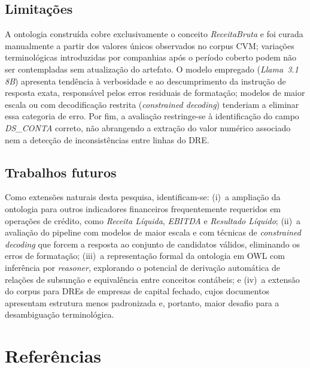 \documentclass[12pt,a4paper]{article}
\begin{document}
\subsection{Limitações}

A ontologia construída cobre exclusivamente o conceito \textit{ReceitaBruta} e foi curada manualmente a partir dos valores únicos observados no corpus CVM; variações terminológicas introduzidas por companhias após o período coberto podem não ser contempladas sem atualização do artefato. O modelo empregado (\textit{Llama~3.1 8B}) apresenta tendência à verbosidade e ao descumprimento da instrução de resposta exata, responsável pelos erros residuais de formatação; modelos de maior escala ou com decodificação restrita (\textit{constrained decoding}) tenderiam a eliminar essa categoria de erro. Por fim, a avaliação restringe-se à identificação do campo \textit{DS\_CONTA} correto, não abrangendo a extração do valor numérico associado nem a detecção de inconsistências entre linhas do DRE.

\subsection{Trabalhos futuros}

Como extensões naturais desta pesquisa, identificam-se: (i)~a ampliação da ontologia para outros indicadores financeiros frequentemente requeridos em operações de crédito, como \textit{Receita Líquida}, \textit{EBITDA} e \textit{Resultado Líquido}; (ii)~a avaliação do pipeline com modelos de maior escala e com técnicas de \textit{constrained decoding} que forcem a resposta ao conjunto de candidatos válidos, eliminando os erros de formatação; (iii)~a representação formal da ontologia em OWL com inferência por \textit{reasoner}, explorando o potencial de derivação automática de relações de subsunção e equivalência entre conceitos contábeis; e (iv)~a extensão do corpus para DREs de empresas de capital fechado, cujos documentos apresentam estrutura menos padronizada e, portanto, maior desafio para a desambiguação terminológica.

\section*{Referências}
\end{document}
